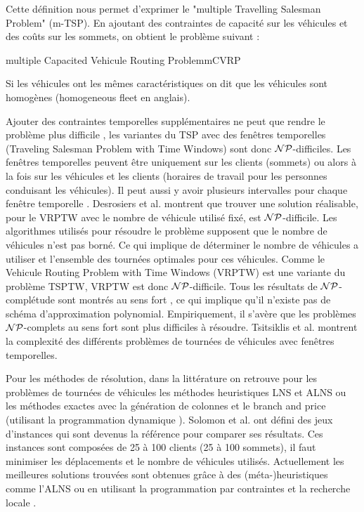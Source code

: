 Cette définition nous permet d'exprimer le "multiple Travelling Salesman Problem" (m-TSP). En ajoutant des contraintes de capacité sur les véhicules et des coûts sur les sommets, on obtient le problème suivant  :
\begin{problem}{multiple Capacited Vehicule Routing Problem}{mCVRP}
\label{pb:VRP}
\end{problem}

Si les véhicules ont les mêmes caractéristiques on dit que les véhicules sont homogènes (homogeneous fleet en anglais).

Ajouter des contraintes temporelles supplémentaires ne peut que rendre le problème plus difficile \cite{Tsitsiklis1992}, les variantes du TSP avec des fenêtres temporelles (Traveling Salesman Problem with Time Windows) sont donc $\mathcal{NP}$-difficiles.
Les fenêtres temporelles peuvent être uniquement sur les clients (sommets) ou alors  à la fois sur les véhicules et les clients (horaires de travail pour les personnes conduisant les véhicules). Il peut aussi y avoir plusieurs intervalles pour chaque fenêtre temporelle \cite{beheshti2015vehicle}. 
Desrosiers et al. \cite{Desrosiers1995} montrent que trouver une solution réalisable, pour le VRPTW avec le nombre de véhicule utilisé fixé, est $\mathcal{NP}$-difficile.
Les algorithmes utilisés pour résoudre le problème supposent que le nombre de véhicules n'est pas borné.
Ce qui implique de déterminer le nombre de véhicules a utiliser et l'ensemble des tournées optimales pour ces véhicules.
Comme le Vehicule Routing Problem with  Time Windows (VRPTW)  est une variante du problème TSPTW, VRPTW est donc $\mathcal{NP}$-difficile.
Tous les résultats de $\mathcal{NP}$-complétude sont montrés au sens fort \cite{garey1978strong}, ce qui implique qu'il n'existe pas de schéma d'approximation polynomial. Empiriquement, il s'avère que les problèmes $\mathcal{NP}$-complets au sens fort sont plus difficiles à résoudre.
Tsitsiklis et al. \cite{Tsitsiklis1992} montrent la complexité des différents problèmes de tournées de véhicules avec fenêtres temporelles.

Pour les méthodes de résolution, dans la littérature on retrouve pour les problèmes de tournées de véhicules les méthodes heuristiques LNS et ALNS ou les méthodes exactes avec la génération de colonnes et le branch and price (utilisant la programmation dynamique \cite{feillet2010,hernandez2014new}).
Solomon et al.\cite{solomon1987} ont défini des jeux d'instances qui sont devenus la référence pour comparer ses résultats.
Ces instances sont composées de 25 à 100 clients (25 à 100 sommets), il faut minimiser les déplacements et le nombre de véhicules utilisés.
Actuellement les meilleures solutions trouvées sont obtenues grâce à des (méta-)heuristiques comme l'ALNS \cite{Ropke2005} ou en utilisant la programmation par contraintes et la recherche locale \cite{shaw1998using}.
